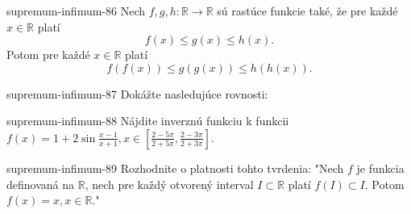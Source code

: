 \begin{defproblem}{supremum-infimum-86}
Nech $f,g,h:\mathbb{R}\rightarrow\mathbb{R}$ sú rastúce funkcie také, že pre každé $x\in\mathbb{R}$ platí $$f(x)\leq g(x)\leq h(x).$$
Potom pre každé $x\in\mathbb{R}$ platí $$f(f(x))\leq g(g(x))\leq h(h(x)).$$
\end{defproblem}

\begin{defproblem}{supremum-infimum-87}
Dokážte nasledujúce rovnosti:
\end{defproblem}

\begin{defproblem}{supremum-infimum-88}
Nájdite inverznú funkciu k funkcii $f(x)=1+2\sin\frac{x-1}{x+1},x\in[\frac{2-5\pi}{2+5\pi},\frac{2-3\pi}{2+3\pi}]$.
\end{defproblem}

\begin{defproblem}{supremum-infimum-89}
Rozhodnite o platnosti tohto tvrdenia: "Nech $f$ je funkcia definovaná na $\mathbb{R}$, nech pre každý otvorený interval $I\subset\mathbb{R}$ platí $f(I)\subset I$. Potom $f(x)=x,x\in\mathbb{R}$."
\end{defproblem}